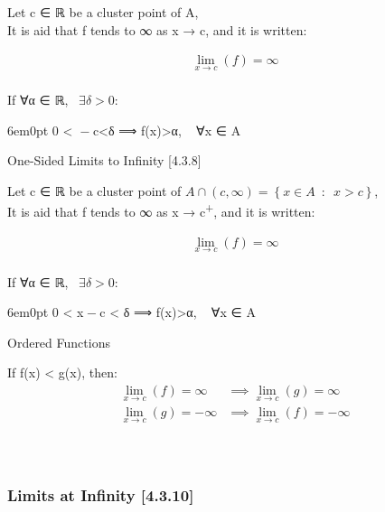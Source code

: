 Let {c} ∈ ℝ be a cluster point of {A},\\
It is aid that {f} tends to ∞ as {x} → {c}, and it is written:

\[\begin{aligned}
\lim_{x\rightarrow
c}\left( f \right) =
\infty \tag{4.3.5}
\label{435}\end{aligned}\]\\

If ∀{α} ∈ ℝ, \(\enspace \exists \delta > 0\):

6em0pt
0 \textless{}  − {c}\textbar\textless{}{δ} ⟹ {f}({x})\textgreater{}{α},  ∀{x} ∈ {A}

One-Sided Limits to Infinity
{[}4.3.8{]}\protect\hypertarget{one-sided-limits-to-infinity-4.3.8}{}{}

Let {c} ∈ ℝ be a cluster point of
\(A\cap \left( c, \infty \right) = \left\{ x \in A \enspace : \enspace x > c \right\}\),\\
It is aid that {f} tends to ∞ as {x} → {c}\textsuperscript{+}, and it is
written:

\[\begin{aligned}
\lim_{x\rightarrow
c}\left( f \right) =
\infty \tag{4.3.8}
\label{438}\end{aligned}\]\\

If ∀{α} ∈ ℝ, \(\enspace \exists \delta > 0\):

6em0pt
0 \textless{} {x} − {c} \textless{} {δ} ⟹ {f}({x})\textgreater{}{α},  ∀{x} ∈ {A}

Ordered Functions\protect\hypertarget{ordered-functions}{}{}

If {f}({x}) \textless{} {g}({x}), then:\\
\[\begin{aligned}
\lim_{x\rightarrow
c}\left( f \right) =
\infty &\implies \lim_{x
\rightarrow c}\left( g
\right) = \infty
\tag{4.3.7 (a)}
\label{437a}\\
\lim_{x\rightarrow
c}\left( g \right) =
-\infty &\implies
\lim_{x \rightarrow
c}\left( f \right) =
-\infty \tag{4.3.7 (b)}
\label{437b}\end{aligned}\]\\

\hypertarget{limits-at-infinity-4.3.10}{%
\subsubsection[\hfill\break
Limits at Infinity
{[}4.3.10{]}]{\texorpdfstring{\protect\hypertarget{SECTION00013300000000000000}{}{}\protect\hypertarget{limits-at-infinity-4.3.10}{}{}~\\
Limits at Infinity
{[}4.3.10{]}}{ Limits at Infinity {[}4.3.10{]}}}\label{limits-at-infinity-4.3.10}}

